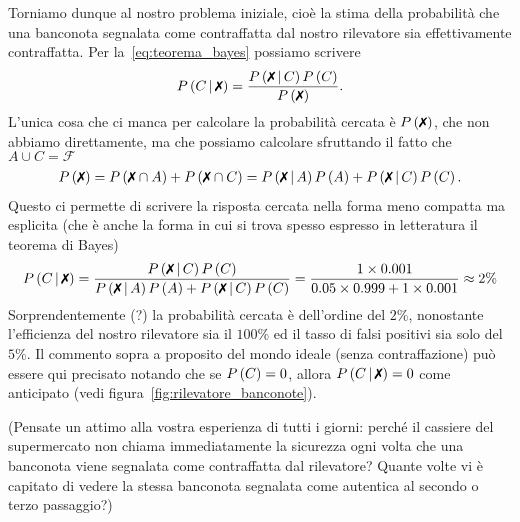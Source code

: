 Torniamo dunque al nostro problema iniziale, cioè la stima della
probabilità che una banconota segnalata come contraffatta dal nostro
rilevatore sia effettivamente contraffatta. Per la~\eqref{eq:teorema_bayes}
possiamo scrivere
\begin{align*}
  \prob{C \cond \xmark} =
  \frac{\prob{\xmark \cond C}\prob{C}}{\prob{\xmark}}.
\end{align*}
L'unica cosa che ci manca per calcolare la probabilità cercata è
$\prob{\xmark}$, che non abbiamo direttamente, ma che possiamo calcolare
sfruttando il fatto che $A \cup C = \mathcal{F}$
\begin{align*}
  \prob{\xmark} =
  \prob{\xmark \cap A} + \prob{\xmark \cap C} =
  \prob{\xmark \cond A}\prob{A} +
  \prob{\xmark \cond C}\prob{C}.
\end{align*}
Questo ci permette di scrivere la risposta cercata nella forma meno compatta
ma esplicita (che è anche la forma in cui si trova spesso espresso in
letteratura il teorema di Bayes)
\begin{align*}
  \prob{C \cond \xmark} =
  \frac{\prob{\xmark \cond C}\prob{C}}%
       {\prob{\xmark \cond A}\prob{A} +
  \prob{\xmark \cond C}\prob{C}} =
  \frac{1 \times 0.001}{0.05 \times 0.999 + 1 \times 0.001} \approx 2\%
\end{align*}
Sorprendentemente (?) la probabilità cercata è dell'ordine del $2\%$,
nonostante l'efficienza del nostro rilevatore sia il $100\%$ ed il tasso di
falsi positivi sia solo del $5\%$. Il commento sopra a proposito del mondo
ideale (senza contraffazione) può essere qui precisato notando che se
$\displaystyle P\left(C\right) = 0$, allora $\prob{C \cond \xmark} = 0$
come anticipato (vedi figura~\ref{fig:rilevatore_banconote}).


(Pensate un attimo alla vostra esperienza di tutti i giorni: perché il
cassiere del supermercato non chiama immediatamente la sicurezza ogni volta
che una banconota viene segnalata come contraffatta dal rilevatore? Quante
volte vi è capitato di vedere la stessa banconota segnalata come autentica
al secondo o terzo passaggio?)


